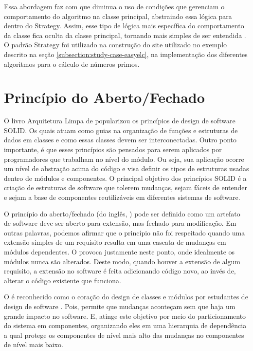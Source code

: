 \documentclass[12pt]{tcc}
\begin{document}
		Essa abordagem faz com que diminua o uso de condições que gerenciam o comportamento do algoritmo na classe principal, abstraindo essa lógica para dentro do Strategy. Assim, esse tipo de lógica mais específica do comportamento da classe fica oculta da classe principal, tornando mais simples de ser entendida  \citep{gamma1994design}. O padrão Strategy foi utilizado na construção do site utilizado no exemplo descrito na seção \ref{subsection:study-case-easyelc}, na implementação dos diferentes algoritmos para o cálculo de números primos.


		\section{Princípio do Aberto/Fechado}
		\label{sec:solid-ocp}
		O livro Arquitetura Limpa de \citet{MartinCleanArchtecture2017} popularizou os princípios de design de software SOLID.
		Os quais atuam como guias na organização de funções e estruturas de dados em classes e como essas classes devem ser interconectadas.
		Outro ponto importante, é que esses princípios são pensados para serem aplicados por programadores que trabalham no nível do módulo.
		Ou seja, sua aplicação ocorre um nível de abstração acima do código e visa definir os tipos de estruturas usadas dentro de módulos e componentes.
		O principal objetivo dos princípios SOLID é a criação de estruturas de software que tolerem mudanças, sejam fáceis de entender e sejam a base de componentes reutilizáveis em diferentes sistemas de software.

		O princípio do aberto/fechado (do inglês, ) pode ser definido como um artefato de software deve ser aberto para extensão, mas fechado para modificação. \citep{Meyer1997ObjectOrientedSoftwareConstruction}
		Em outras palavras, podemos afirmar que o princípio não foi respeitado quando uma extensão simples de um requisito resulta em uma cascata de mudanças em módulos dependentes.
		O  provoca justamente neste ponto, onde idealmente os módulos nunca são alterados.
		Deste modo, quando houver a extensão de algum requisito, a extensão no software é feita adicionando código novo, ao invés de, alterar o código existente que funciona. \citep{Martin2000TheOP}

		O  é reconhecido como o coração do design de classes e módulos por estudantes de design de software \citep{MartinCleanArchtecture2017}.
		Pois, permite que mudanças aconteçam sem que haja um grande impacto no software.
		E, atinge este objetivo por meio do particionamento do sistema em componentes, organizando eles em uma hierarquia de dependência a qual protege os componentes de nível mais alto das mudanças no componentes de nível mais baixo. \citep{MartinCleanArchtecture2017}
\end{document}
